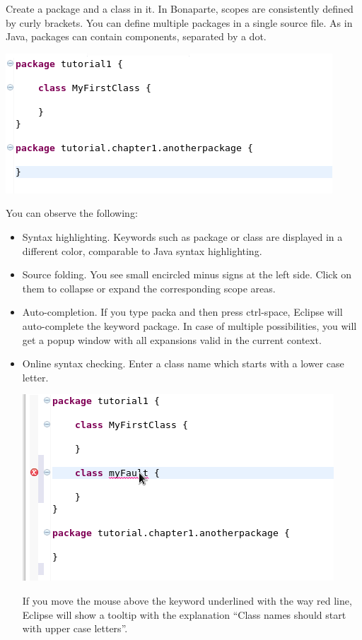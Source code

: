 \documentclass[11pt,a4paper,oneside]{article}
\begin{document}
Create a package and a class in it. In Bonaparte, scopes are consistently defined by curly brackets. You can define multiple packages in a single source file.
As in Java, packages can contain components, separated by a dot.

\vspace{2mm}
\hspace{1cm}\includegraphics[scale=0.5]{images/tut1-001.png}

\noindent
You can observe the following:
\begin{itemize}
  \item Syntax highlighting. Keywords such as {\ttfamily package} or {\ttfamily class} are displayed in a different color,
  comparable to Java syntax highlighting.
  \item Source folding. You see small encircled minus signs at the left side. Click on them to collapse or expand the corresponding scope areas.
  \item Auto-completion.  If you type {\ttfamily packa} and then press ctrl-space, Eclipse will auto-complete the keyword {\ttfamily package}.
  In case of multiple possibilities, you will get a popup window with all expansions valid in the current context. 
  \item Online syntax checking. Enter a class name which starts with a lower case letter.  

\vspace{2mm}

\hspace{1cm}\includegraphics[scale=0.5]{images/tut1-002.png}

    \noindent 
    If you move the mouse above the keyword underlined with the way red line, Eclipse will show a tooltip with the explanation
     ``Class names should start with upper case letters''. 
 
\end{itemize}
\end{document}
